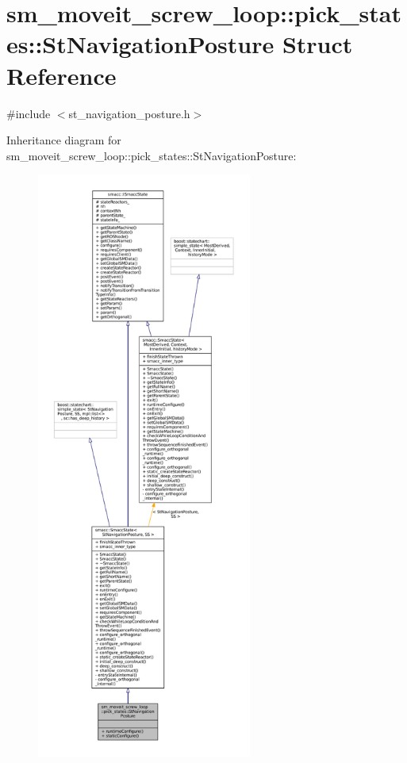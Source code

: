 \hypertarget{structsm__moveit__screw__loop_1_1pick__states_1_1StNavigationPosture}{}\section{sm\+\_\+moveit\+\_\+screw\+\_\+loop\+:\+:pick\+\_\+states\+:\+:St\+Navigation\+Posture Struct Reference}
\label{structsm__moveit__screw__loop_1_1pick__states_1_1StNavigationPosture}


{\ttfamily \#include $<$st\+\_\+navigation\+\_\+posture.\+h$>$}



Inheritance diagram for sm\+\_\+moveit\+\_\+screw\+\_\+loop\+:\+:pick\+\_\+states\+:\+:St\+Navigation\+Posture\+:
\nopagebreak
\begin{figure}[H]
\begin{center}
\leavevmode
\includegraphics[height=550pt]{structsm__moveit__screw__loop_1_1pick__states_1_1StNavigationPosture__inherit__graph}
\end{center}
\end{figure}


